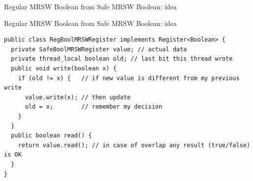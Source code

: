 \begin{frame}{Regular MRSW Boolean from Safe MRSW Boolean: idea}




\end{frame}

\begin{frame}[fragile]{Regular MRSW Boolean from Safe MRSW Boolean: idea}

\begin{verbatim}
public class RegBoolMRSWRegister implements Register<Boolean> {
  private SafeBoolMRSWRegister value; // actual data
  private thread_local boolean old; // last bit this thread wrote
  public void write(boolean x) {
    if (old != x) {   // if new value is different from my previous write
      value.write(x); // then update
      old = x;        // remember my decision
    }
  }
  public boolean read() {
    return value.read(); // in case of overlap any result (true/false) is OK
  }
}
\end{verbatim}
\end{frame}


